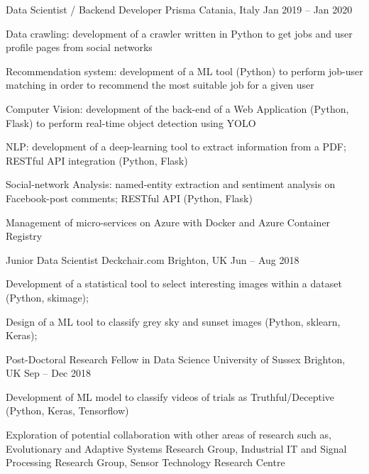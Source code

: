 \begin{cventries}
    \cventry
    {Data Scientist / Backend Developer}
    {Prisma}    
    {Catania, Italy}
    {Jan 2019 -- Jan 2020}
    {
      \begin{cvitems}
        \item {Data crawling: development of a crawler written in Python to get jobs and user profile pages from social networks}
        \item {Recommendation system: development of a ML tool (Python) to perform job-user matching in order to recommend the most suitable job for a given user}
        \item {Computer Vision: development of the back-end of a Web Application (Python, Flask) to perform real-time object detection using YOLO}
        \item {NLP: development of a deep-learning tool to extract information from a PDF; RESTful API integration (Python, Flask)}
        \item {Social-network Analysis: named-entity extraction and sentiment analysis on Facebook-post comments; RESTful API (Python, Flask)}
        \item {Management of micro-services on Azure with Docker and Azure Container Registry}
      \end{cvitems}
    }

    \cventry
    {Junior Data Scientist}
    {Deckchair.com}
    {Brighton, UK}
    {Jun -- Aug 2018}
    {
      \begin{cvitems}
        \item Development of a statistical tool to select interesting images within a dataset (Python, skimage);
        \item Design of a ML tool to classify grey sky and sunset images (Python, sklearn, Keras);
      \end{cvitems}
    }
  \end{cventries}


  \begin{cventries}
    \cventry
    {Post-Doctoral Research Fellow in Data Science}
    {University of Sussex}
    {Brighton, UK}
    {Sep -- Dec 2018}
    {
      \begin{cvitems}
        \item Development of ML model to classify videos of trials as Truthful/Deceptive (Python, Keras, Tensorflow)
        \item Exploration of potential collaboration with other areas of research such as, Evolutionary and Adaptive Systems Research Group, Industrial IT and Signal Processing Research Group, Sensor Technology Research Centre
      \end{cvitems}
    }
  \end{cventries}

